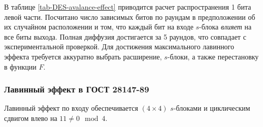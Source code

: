 В таблице \ref{tab-DES-avalance-effect} приводится расчет распространения 1 бита левой части.  Посчитано число зависимых битов по раундам в предположении об их случайном расположении и том, что каждый бит на входе $s$-блока \emph{влияет} на все биты выхода. Полная диффузия достигается за 5 раундов, что совпадает с экспериментальной проверкой. Для достижения максимального лавинного эффекта требуется аккуратно выбрать расширение, $s$-блоки, а также перестановку в функции $F$.


\subsubsection{Лавинный эффект в ГОСТ 28147-89}

Лавинный эффект по входу обеспечивается $(4 \times 4)$ $s$-блоками и циклическим сдвигом влево на $11 \neq 0 \mod 4$.

\begin{table}[h!]
    \centering
    \caption{Распространение влияния 1 бита левой части в ГОСТ 28147-89\label{tab:GOST-avalance-effect}}
\end{table}

